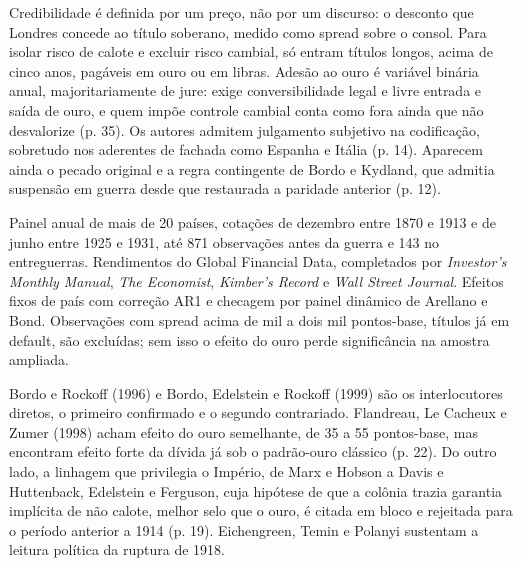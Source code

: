 
Credibilidade é definida por um preço, não por um discurso: o desconto que
Londres concede ao título soberano, medido como spread sobre o consol. Para
isolar risco de calote e excluir risco cambial, só entram títulos longos, acima
de cinco anos, pagáveis em ouro ou em libras. Adesão ao ouro é variável binária
anual, majoritariamente de jure: exige conversibilidade legal e livre entrada e
saída de ouro, e quem impõe controle cambial conta como fora ainda que não
desvalorize (p. 35). Os autores admitem julgamento subjetivo na codificação,
sobretudo nos aderentes de fachada como Espanha e Itália (p. 14). Aparecem
ainda o pecado original e a regra contingente de Bordo e Kydland, que admitia
suspensão em guerra desde que restaurada a paridade anterior (p. 12).


Painel anual de mais de 20 países, cotações de dezembro entre 1870 e 1913 e de
junho entre 1925 e 1931, até 871 observações antes da guerra e 143 no
entreguerras. Rendimentos do Global Financial Data, completados por
\textit{Investor's Monthly Manual}, \textit{The Economist}, \textit{Kimber's
Record} e \textit{Wall Street Journal}. Efeitos fixos de país com correção AR1 e
checagem por painel dinâmico de Arellano e Bond. Observações com spread acima de
mil a dois mil pontos-base, títulos já em default, são excluídas; sem isso o
efeito do ouro perde significância na amostra ampliada.


Bordo e Rockoff (1996) e Bordo, Edelstein e Rockoff (1999) são os
interlocutores diretos, o primeiro confirmado e o segundo contrariado.
Flandreau, Le Cacheux e Zumer (1998) acham efeito do ouro semelhante, de 35 a 55
pontos-base, mas encontram efeito forte da dívida já sob o padrão-ouro clássico
(p. 22). Do outro lado, a linhagem que privilegia o Império, de Marx e Hobson a
Davis e Huttenback, Edelstein e Ferguson, cuja hipótese de que a colônia trazia
garantia implícita de não calote, melhor selo que o ouro, é citada em bloco e
rejeitada para o período anterior a 1914 (p. 19). Eichengreen, Temin e Polanyi
sustentam a leitura política da ruptura de 1918.


